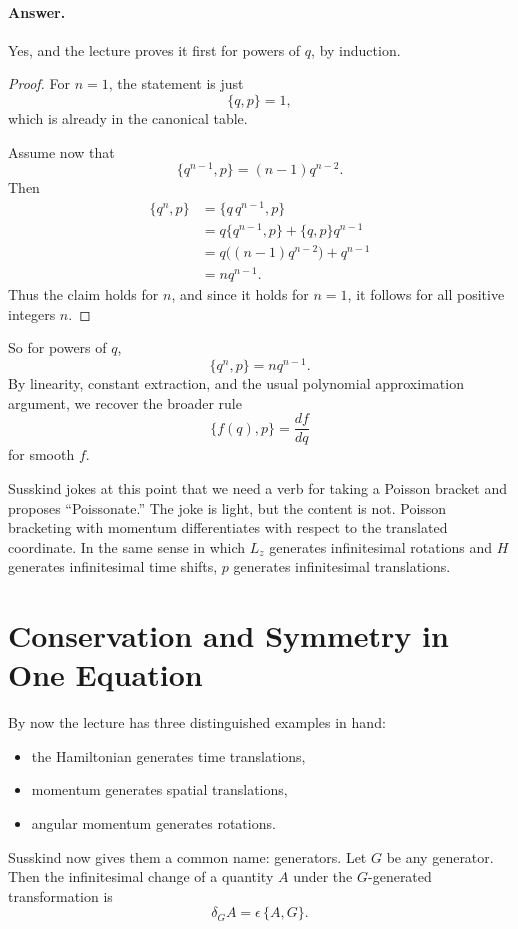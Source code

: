 \paragraph{Answer.} Yes, and the lecture proves it first for powers of \(q\), by induction.

\begin{proof}
For \(n=1\), the statement is just
\[
\{q,p\}=1,
\]
which is already in the canonical table.

Assume now that
\[
\{q^{n-1},p\}=(n-1)q^{n-2}.
\]
Then
\begin{align}
\{q^n,p\}
&=\{q\,q^{n-1},p\}\\
&=q\{q^{n-1},p\}+\{q,p\}q^{n-1}\\
&=q\bigl((n-1)q^{n-2}\bigr)+q^{n-1}\\
&=nq^{n-1}.
\end{align}
Thus the claim holds for \(n\), and since it holds for \(n=1\), it follows for all positive integers \(n\).
\end{proof}

So for powers of \(q\),
\begin{equation}
\{q^n,p\}=nq^{n-1}.
\end{equation}
By linearity, constant extraction, and the usual polynomial approximation argument, we recover the broader rule
\begin{equation}
\{f(q),p\}=\frac{df}{dq}
\end{equation}
for smooth \(f\).

Susskind jokes at this point that we need a verb for taking a Poisson bracket and proposes ``Poissonate.'' The joke is light, but the content is not. Poisson bracketing with momentum differentiates with respect to the translated coordinate. In the same sense in which \(L_z\) generates infinitesimal rotations and \(H\) generates infinitesimal time shifts, \(p\) generates infinitesimal translations.

\section{Conservation and Symmetry in One Equation}

By now the lecture has three distinguished examples in hand:
\begin{itemize}
\item the Hamiltonian generates time translations,
\item momentum generates spatial translations,
\item angular momentum generates rotations.
\end{itemize}
Susskind now gives them a common name: generators. Let \(G\) be any generator. Then the infinitesimal change of a quantity \(A\) under the \(G\)-generated transformation is
\begin{equation}
\delta_G A=\epsilon\,\{A,G\}.
\end{equation}


